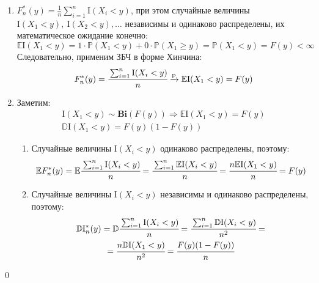 \documentclass[oneside,final,14pt]{extreport}
\renewenvironment{proof}{{\bfseries Доказательство.}}{\qed}
\theoremstyle{definition}
\begin{document}
\begin{proof}\leavevmode
\begin{enumerate}
    \item $F_{n}^{*}(y)=\frac{1}{n} \sum_{i=1}^{n} \mathrm{I}(X_{i}<y)$, при этом случайные величины $\mathrm{I}(X_{1}<y),~ \mathrm{I}(X_{2}<y), \ldots$ независимы и одинаково распределены, их математическое ожидание конечно:
    \begin{equation*}
        \mathbb{E}\mathrm{I}(X_{1}<y)=1 \cdot \mathbb{P}(X_{1}<y)+0 \cdot \mathbb{P}(X_{1} \geqslant y)=\mathbb{P}(X_{1}<y)=F(y)<\infty
    \end{equation*}
    Следовательно, применим ЗБЧ в форме Хинчина:
    \begin{equation*}
        F_{n}^{*}(y)=\cfrac{\sum_{i=1}^{n} \mathrm{I}(X_{i}<y)}{n} \xrightarrow[]{\mathrm{p}} \mathbb{E}\mathrm{I}(X_{1}<y)=F(y) 
    \end{equation*}
    \item Заметим:
    \begin{gather*}
        \mathrm{I}(X_{1}<y) \sim  \mathbf{Bi}(F(y)) \Rightarrow \mathbb{E}\mathrm{I}(X_{1}<y) = F(y) \\
        \mathbb{D}\mathrm{I}(X_{1}<y) = F(y)(1-F(y))
    \end{gather*}
    \begin{enumerate}[label={\arabic*)}]
        \item Случайные величины $\mathrm{I}(X_{i}<y)$ одинаково распределены, поэтому:
        \begin{equation*}
            \mathbb{E} F_{n}^{*}(y)=\mathbb{E} \cfrac{\sum_{i=1}^{n} \mathrm{I}(X_{i}<y)}{n}=\cfrac{\sum_{i=1}^{n} \mathbb{E}\mathrm{I}(X_{i}<y)}{n}=\cfrac{n \mathbb{E}\mathrm{I}(X_{1}<y)}{n}=F(y)  
        \end{equation*}
        
        \item Случайные величины $\mathrm{I}(X_{i}<y)$ независимы и одинаково распределены, поэтому:
        \begin{multline*}
            \mathbb{D}\mathrm{I}_{n}^{*}(y)
            = \mathbb{D} \cfrac{\sum_{i=1}^{n} \mathrm{I}(X_{i}<y)}{n}
            = \cfrac{\sum_{i=1}^{n} \mathbb{D}\mathrm{I}(X_{i}<y)}{n^{2}}
            = \\
            = \cfrac{n\mathbb{D}\mathrm{I}(X_{1}<y)}{n^{2}}
            = \cfrac{F(y)(1-F(y))}{n}
        \end{multline*}
    

\end{enumerate}
\end{enumerate}
\end{proof}
\end{document}
